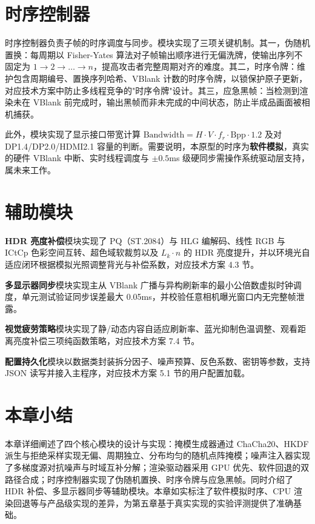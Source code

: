 \section{时序控制器}

时序控制器负责子帧的时序调度与同步。模块实现了三项关键机制。其一，伪随机置换：每周期以 Fisher-Yates 算法对子帧输出顺序进行无偏洗牌，使输出序列不固定为 $1\to2\to\dots\to n$，提高攻击者完整周期对齐的难度。其二，时序令牌：维护包含周期编号、置换序列哈希、VBlank 计数的时序令牌，以锁保护原子更新，对应技术方案中防止多线程竞争的"时序令牌"设计。其三，应急黑帧：当检测到渲染未在 VBlank 前完成时，输出黑帧而非未完成的中间状态，防止半成品画面被相机捕获。

此外，模块实现了显示接口带宽计算 $\text{Bandwidth} = H\cdot V\cdot f_r\cdot \text{Bpp}\cdot 1.2$ 及对 DP1.4/DP2.0/HDMI2.1 容量的判断。需要说明，本原型的时序为\textbf{软件模拟}，真实的硬件 VBlank 中断、实时线程调度与 $\pm0.5$ms 级硬同步需操作系统驱动层支持，属未来工作。

\section{辅助模块}

\textbf{HDR 亮度补偿}模块实现了 PQ（ST.2084）与 HLG 编解码、线性 RGB 与 ICtCp 色彩空间互转、超色域软裁剪以及 $L_k\cdot n$ 的 HDR 亮度提升，并以环境光自适应闭环根据模拟光照调整背光与补偿系数，对应技术方案 4.3 节。

\textbf{多显示器同步}模块实现主从 VBlank 广播与异构刷新率的最小公倍数虚拟时钟调度，单元测试验证同步误差最大 0.05ms，并校验任意相机曝光窗口内无完整帧泄露。

\textbf{视觉疲劳策略}模块实现了静/动态内容自适应刷新率、蓝光抑制色温调整、观看距离亮度补偿三项纯函数策略，对应技术方案 7.4 节。

\textbf{配置持久化}模块以数据类封装拆分因子、噪声预算、反色系数、密钥等参数，支持 JSON 读写并接入主程序，对应技术方案 5.1 节的用户配置加载。

\section{本章小结}

本章详细阐述了四个核心模块的设计与实现：掩模生成器通过 ChaCha20、HKDF 派生与拒绝采样实现无偏、周期独立、分布均匀的随机点阵掩模；噪声注入器实现了多梯度源对抗噪声与时域互补分解；渲染驱动器采用 GPU 优先、软件回退的双路径合成；时序控制器实现了伪随机置换、时序令牌与应急黑帧。同时介绍了 HDR 补偿、多显示器同步等辅助模块。本章如实标注了软件模拟时序、CPU 渲染回退等与产品级实现的差异，为第五章基于真实实现的实验评测提供了准确基础。
